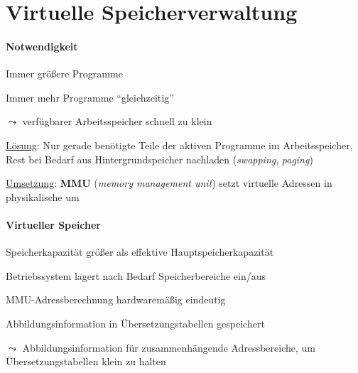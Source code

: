 \section{Virtuelle Speicherverwaltung}

\paragraph{Notwendigkeit}
\begin{items}
  \item Immer größere Programme
  \item Immer mehr Programme "`gleichzeitig"'
  \item \( \leadsto \) verfügbarer Arbeitsspeicher schnell zu klein
  \item \underline{Lösung}: Nur gerade benötigte Teile der aktiven Programme im Arbeitsspeicher, Rest bei Bedarf aus Hintergrundspeicher nachladen (\emph{swapping}, \emph{paging})
  \item \underline{Umsetzung}: \textbf{MMU} (\emph{memory management unit}) setzt virtuelle Adressen in physikalische um
\end{items}

\paragraph{Virtueller Speicher}
\begin{items}
  \item Speicherkapazität größer als effektive Hauptspeicherkapazität
  \item Betriebssystem lagert nach Bedarf Speicherbereiche ein/aus
  \item MMU-Adressberechnung hardwaremäßig eindeutig
  \item Abbildungsinformation in Übersetzungstabellen gespeichert
  \item \( \leadsto \) Abbildungsinformation für zusammenhängende Adressbereiche, um Übersetzungstabellen klein zu halten
\end{items}

